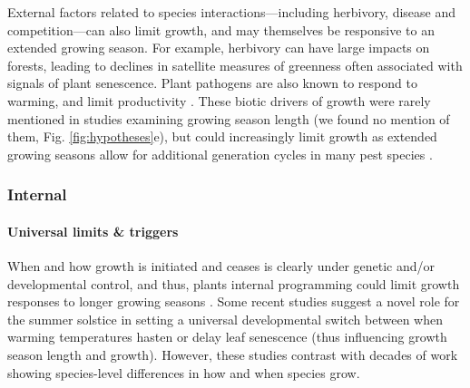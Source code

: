 \documentclass[11pt]{article}
\begin{document}
External factors related to species interactions---including herbivory, disease and competition---can also limit growth, and may themselves be responsive to an extended growing season. For example, herbivory can have large impacts on forests, leading to declines in satellite measures of greenness often associated with signals of plant senescence. Plant pathogens are also known to respond to warming, and limit productivity \citep{sturrock2011climate,la2008forest}. These biotic drivers of growth were rarely mentioned in studies examining growing season length (we found no mention of them, Fig. \ref{fig:hypotheses}e), but could increasingly limit growth as extended growing seasons allow for additional generation cycles in many pest species \citep{mitton2012mountain,lange2006thresholds}.

\subsubsection*{Internal}

\paragraph{Universal limits \& triggers} 
When and how growth is initiated and ceases is clearly under genetic and/or developmental control, and thus, plants internal programming could limit growth responses to longer growing seasons \citep{marchand2021timing,mckown2016impacts,soolanayakanahally2013timing}. Some recent studies suggest a novel role for the summer solstice \citep{zohner2023effect} in setting a universal developmental switch between when warming temperatures hasten or delay leaf senescence (thus influencing growth season length and growth). However, these studies contrast with decades of work showing species-level differences in how and when species grow.  %
\end{document}
